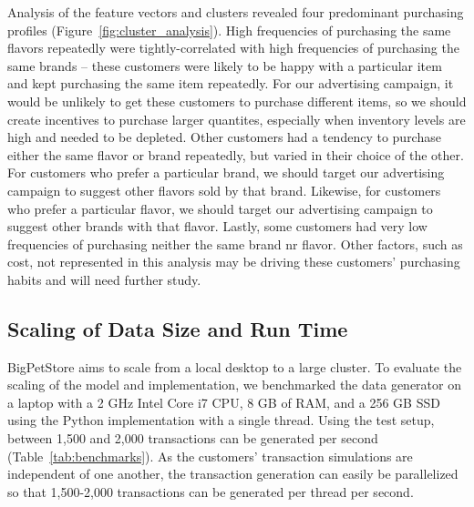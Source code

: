 \documentclass[conference]{IEEEtran}
\begin{document}
Analysis of the feature vectors and clusters revealed four predominant purchasing profiles (Figure~\ref{fig:cluster_analysis}).  High frequencies of purchasing the same flavors repeatedly were tightly-correlated with high frequencies of purchasing the same brands -- these customers were likely to be happy with a particular item and kept purchasing the same item repeatedly.  For our advertising campaign, it would be unlikely to get these customers to purchase different items, so we should create incentives to purchase larger quantites, especially when inventory levels are high and needed to be depleted.  Other customers had a tendency to purchase either the same flavor or brand repeatedly, but varied in their choice of the other.  For customers who prefer a particular brand, we should target our advertising campaign to suggest other flavors sold by that brand.  Likewise, for customers who prefer a particular flavor, we should target our advertising campaign to suggest other brands with that flavor.  Lastly, some customers had very low frequencies of purchasing neither the same brand nr flavor.  Other factors, such as cost, not represented in this analysis may be driving these customers' purchasing habits and will need further study.


\subsection{Scaling of Data Size and Run Time}
BigPetStore aims to scale from a local desktop to a large cluster. To evaluate the scaling of the model and implementation, we benchmarked the data generator on a laptop with a 2 GHz Intel Core i7 CPU, 8 GB of RAM, and a 256 GB SSD using the Python implementation with a single thread. Using the test setup, between 1,500 and 2,000 transactions can be generated per second (Table~\ref{tab:benchmarks}). As the customers' transaction simulations are independent of one another, the transaction generation can easily be parallelized so that 1,500-2,000 transactions can be generated per thread per second.
\end{document}
